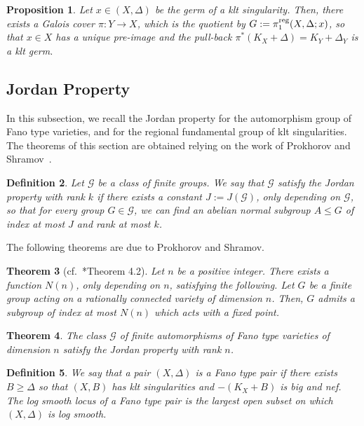 \documentclass{amsart}
\newtheorem{theorem}{Theorem}[section]
\newtheorem{proposition}[theorem]{Proposition}
\newtheorem{definition}[theorem]{Definition}
\theoremstyle{remark}
\numberwithin{equation}{section}
\begin{document}
\begin{proposition}\label{prop:existence-universal-cover}
Let $x\in (X,\Delta)$ be the germ of a klt singularity.
Then, there exists a Galois cover $\pi\colon Y\rightarrow X$,
which is the quotient by $G:=\pi_1^{\rm reg}(X,\Delta;x)$,
so that $x\in X$ has a unique pre-image
and the pull-back $\pi^*(K_X+\Delta)=K_Y+\Delta_Y$ is a klt germ.
\end{proposition}

\subsection{Jordan Property}\label{subsec:jp}
In this subsection, we recall the Jordan property for the automorphism group of Fano type varieties, and for the regional fundamental group of klt singularities.
The theorems of this section are obtained relying on the work of Prokhorov and Shramov~\cites{PS14,PS16}.

\begin{definition}
{\em 
Let $\mathcal{G}$ be a class of finite groups.
We say that $\mathcal{G}$ satisfy the Jordan property with rank $k$
if there exists a constant $J:=J(\mathcal{G})$, only depending on $\mathcal{G}$, so that
for every group $G\in \mathcal{G}$, we can find an abelian normal subgroup
$A\leqslant G$ of index at most $J$ and rank at most $k$.
}
\end{definition}

The following theorems are due to Prokhorov and Shramov.

\begin{theorem}[cf.~\cite{PS16}*{Theorem 4.2}]\label{thm:fixed-point-RC}
Let $n$ be a positive integer.
There exists a function $N(n)$, only depending on $n$, satisfying the following.
Let $G$ be a finite group acting on a rationally connected variety of dimension $n$.
Then, $G$ admits a subgroup of index at most $N(n)$
which acts with a fixed point.
\end{theorem}

\begin{theorem}\label{thm:Jordan-FT}
The class $\mathcal{G}$ of finite automorphisms of Fano type varieties of dimension $n$
satisfy the Jordan property with rank $n$.
\end{theorem}

\begin{definition}{\em 
We say that a pair $(X,\Delta)$ is a {\em Fano type pair} if there exists
$B\geq \Delta$ so that $(X,B)$ has klt singularities and $-(K_X+B)$ is big and nef.
The {\em log smooth locus} of a Fano type pair is the largest open subset on which $(X,\Delta)$ is log smooth.
}
\end{definition} 
\end{document}

